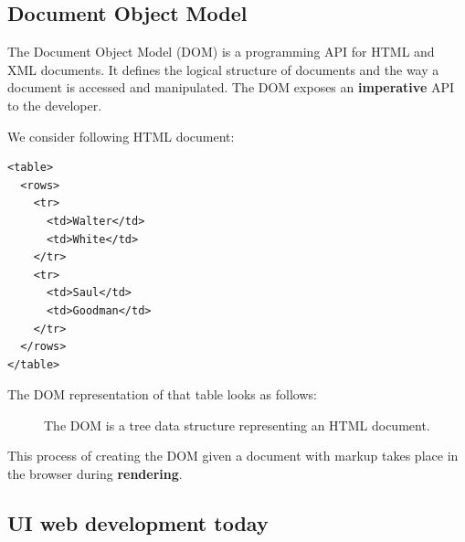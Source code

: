 \subsection{Document Object Model}\label{documentobjectmodel}

The Document Object Model (DOM) is a programming API for HTML and XML documents. It defines the logical structure of documents and the way a document is accessed and manipulated. \citep{dom} The DOM exposes an \textbf{imperative} API to the developer.

We consider following HTML document:

\lstset{language=XML}
\begin{lstlisting}[caption=HTML document of a table, label=htmloftable]
<table>
  <rows>
    <tr>
      <td>Walter</td>
      <td>White</td>
    </tr>
    <tr>
      <td>Saul</td>
      <td>Goodman</td>
    </tr>
  </rows>
</table>
\end{lstlisting}

The DOM representation of that table looks as follows:

\begin{figure}[!htb]
  \caption{\label{fig:my-label} The DOM is a tree data structure representing an HTML document.}
\end{figure}

This process of creating the DOM given a document with markup takes place in the browser during \textbf{rendering}.

\subsection{UI web development today}\label{uidevelopmenttoday}

